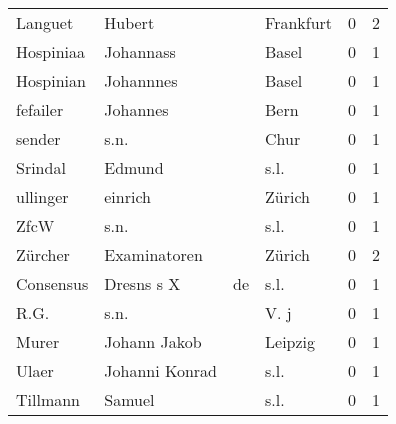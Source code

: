 \begin{tabular}{llllrr}
                  Languet &                             Hubert &             &                                   Frankfurt &          0 &         2 \\
                Hospiniaa &                          Johannass &             &                                       Basel &          0 &         1 \\
                Hospinian &                          Johannnes &             &                                       Basel &          0 &         1 \\
                 fefailer &                           Johannes &             &                                        Bern &          0 &         1 \\
                   sender &                               s.n. &             &                                        Chur &          0 &         1 \\
                  Srindal &                             Edmund &             &                                        s.l. &          0 &         1 \\
                 ullinger &                            einrich &             &                                      Zürich &          0 &         1 \\
                     ZfcW &                               s.n. &             &                                        s.l. &          0 &         1 \\
                  Zürcher &                       Examinatoren &             &                                      Zürich &          0 &         2 \\
                Consensus &                         Dresns s X &          de &                                        s.l. &          0 &         1 \\
                     R.G. &                               s.n. &             &                                        V. j &          0 &         1 \\
                    Murer &                       Johann Jakob &             &                                     Leipzig &          0 &         1 \\
                    Ulaer &                     Johanni Konrad &             &                                        s.l. &          0 &         1 \\
                 Tillmann &                             Samuel &             &                                        s.l. &          0 &         1 \\

\end{tabular}
